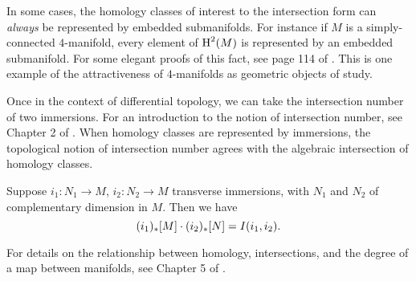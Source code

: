 \begin{remark}\label{rmk:homology-dimension-4-embedding}
	In some cases, the homology classes of interest to the intersection form can \emph{always} be represented by embedded submanifolds. For instance if $M$ is a simply-connected $4$-manifold, every element of $\operatorname{H}^2(M)$ is represented by an embedded submanifold. For some elegant proofs of this fact, see page 114 of \cite{scorpan2005wild}.
	This is one example of the attractiveness of $4$-manifolds as geometric objects of study.
\end{remark}

Once in the context of differential topology, we can take the intersection number of two immersions. For an introduction to the notion of intersection number, see Chapter 2 of \cite{gp2010topology}. When homology classes are represented by immersions, the topological notion of intersection number agrees with the algebraic intersection of homology classes.

\begin{theorem}
	Suppose $i_1 : N_1 \to M$, $i_2 : N_2 \to M$ transverse immersions, with $N_1$ and $N_2$ of complementary dimension in $M$. Then we have
	\[(i_1)_*[M]\cdot (i_2)_*[N] = I(i_1,i_2).\]
\end{theorem}

For details on the relationship between homology, intersections, and the degree of a map between manifolds, see Chapter 5 of \cite{hirsch1976differential}.

